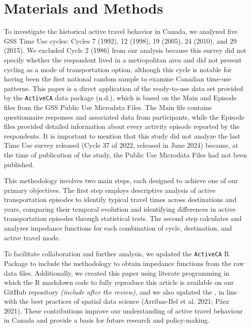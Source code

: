 \documentclass[preprint, 3p,
authoryear]{elsarticle} %
\begin{document}
\hypertarget{materials-and-methods}{%
\section{Materials and Methods}\label{materials-and-methods}}

To investigate the historical active travel behavior in Canada, we
analyzed five GSS Time Use cycles: Cycles 7 (1992), 12 (1998), 19
(2005), 24 (2010), and 29 (2015). We excluded Cycle 2 (1986) from our
analysis because this survey did not specify whether the respondent
lived in a metropolitan area and did not present cycling as a mode of
transportation option, although this cycle is notable for having been
the first national random sample to examine Canadian time-use patterns.
This paper is a direct application of the ready-to-use data set provided
by the \texttt{ActiveCA} data package (n.d.), which is based on the Main
and Episode files from the GSS Public Use Microdata Files. The Main file
contains questionnaire responses and associated data from participants,
while the Episode files provided detailed information about every
activity episode reported by the respondents. It is important to mention
that this study did not analyze the last Time Use survey released (Cycle
37 of 2022, released in June 2024) because, at the time of publication
of the study, the Public Use Microdata Files had not been published.

This methodology involves two main steps, each designed to achieve one
of our primary objectives. The first step employs descriptive analysis
of active transportation episodes to identify typical travel times
across destinations and years, comparing their temporal evolution and
identifying differences in active transportation episodes through
statistical tests. The second step calculates and analyzes impedance
functions for each combination of cycle, destination, and active travel
mode.

To facilitate collaboration and further analysis, we updated the
\texttt{ActiveCA} R Package to include the methodology to obtain
impedance functions from the raw data files. Additionally, we created
this paper using literate programming in which the R markdown code to
fully reproduce this article is available on our GitHub repository
\emph{(include after the review)}, and we also updated the , in line
with the best practices of spatial data science (Arribas-Bel et al.
2021; Páez 2021). These contributions improve our understanding of
active travel behaviour in Canada and provide a basis for future
research and policy-making.
\end{document}
